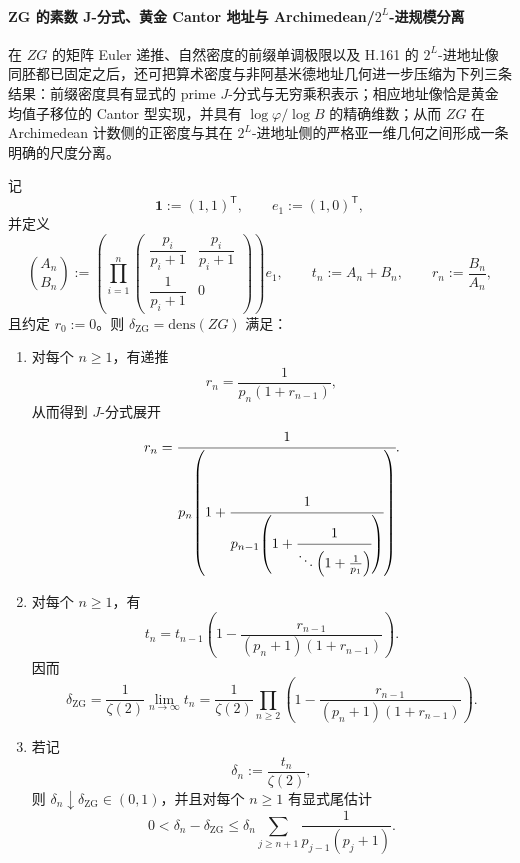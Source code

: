 \paragraph{ZG 的素数 J-分式、黄金 Cantor 地址与 Archimedean/\texorpdfstring{$2^L$}{2^L}-进规模分离}
在 \(ZG\) 的矩阵 Euler 递推、自然密度的前缀单调极限以及 H.161 的 \(2^L\)-进地址像同胚都已固定之后，还可把算术密度与非阿基米德地址几何进一步压缩为下列三条结果：前缀密度具有显式的 prime \(J\)-分式与无穷乘积表示；相应地址像恰是黄金均值子移位的 Cantor 型实现，并具有 \(\log\varphi/\log B\) 的精确维数；从而 \(ZG\) 在 Archimedean 计数侧的正密度与其在 \(2^L\)-进地址侧的严格亚一维几何之间形成一条明确的尺度分离。

\begin{theorem}\label{thm:xi-time-part62dgd-zg-density-prime-jfraction-positive}
记
\[
\mathbf 1:=(1,1)^{\mathsf T},
\qquad
e_1:=(1,0)^{\mathsf T},
\]
并定义
\[
\binom{A_n}{B_n}
:=
\left(
\prod_{i=1}^{n}
\begin{pmatrix}
\dfrac{p_i}{p_i+1} & \dfrac{p_i}{p_i+1}\\[1ex]
\dfrac{1}{p_i+1} & 0
\end{pmatrix}
\right)e_1,
\qquad
t_n:=A_n+B_n,
\qquad
r_n:=\frac{B_n}{A_n},
\]
且约定 \(r_0:=0\)。则 \(\delta_{\mathrm{ZG}}=\mathrm{dens}(ZG)\) 满足：
\begin{enumerate}
  \item 对每个 \(n\ge 1\)，有递推
  \[
  r_n=\frac{1}{p_n(1+r_{n-1})},
  \]
  从而得到 \(J\)-分式展开
  \[
  r_n=
  \cfrac{1}{p_n\!\left(1+\cfrac{1}{p_{n-1}\!\left(1+\cfrac{1}{\ddots\left(1+\frac1{p_1}\right)}\right)}\right)}.
  \]
  \item 对每个 \(n\ge 1\)，有
  \[
  t_n
  =
  t_{n-1}\left(1-\frac{r_{n-1}}{(p_n+1)(1+r_{n-1})}\right).
  \]
  因而
  \[
  \delta_{\mathrm{ZG}}
  =
  \frac1{\zeta(2)}\lim_{n\to\infty}t_n
  =
  \frac1{\zeta(2)}
  \prod_{n\ge 2}
  \left(1-\frac{r_{n-1}}{(p_n+1)(1+r_{n-1})}\right).
  \]
  \item 若记
  \[
  \delta_n:=\frac{t_n}{\zeta(2)},
  \]
  则 \(\delta_n\downarrow \delta_{\mathrm{ZG}}\in(0,1)\)，并且对每个 \(n\ge 1\) 有显式尾估计
  \[
  0<\delta_n-\delta_{\mathrm{ZG}}
  \le
  \delta_n\sum_{j\ge n+1}\frac{1}{p_{j-1}(p_j+1)}.
  \]
\end{enumerate}
\end{theorem}
